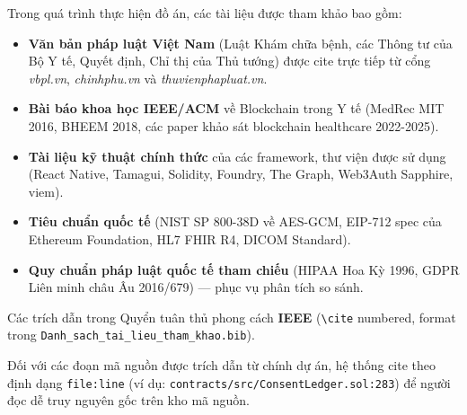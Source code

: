 \documentclass[../DoAn]{subfiles}
\begin{document}

Trong quá trình thực hiện đồ án, các tài liệu được tham khảo bao gồm:

\begin{itemize}
    \item \textbf{Văn bản pháp luật Việt Nam} (Luật Khám chữa bệnh, các Thông tư của Bộ Y tế, Quyết định, Chỉ thị của Thủ tướng) được cite trực tiếp từ cổng \textit{vbpl.vn}, \textit{chinhphu.vn} và \textit{thuvienphapluat.vn}.
    \item \textbf{Bài báo khoa học IEEE/ACM} về Blockchain trong Y tế (MedRec MIT 2016, BHEEM 2018, các paper khảo sát blockchain healthcare 2022-2025).
    \item \textbf{Tài liệu kỹ thuật chính thức} của các framework, thư viện được sử dụng (React Native, Tamagui, Solidity, Foundry, The Graph, Web3Auth Sapphire, viem).
    \item \textbf{Tiêu chuẩn quốc tế} (NIST SP 800-38D về AES-GCM, EIP-712 spec của Ethereum Foundation, HL7 FHIR R4, DICOM Standard).
    \item \textbf{Quy chuẩn pháp luật quốc tế tham chiếu} (HIPAA Hoa Kỳ 1996, GDPR Liên minh châu Âu 2016/679) — phục vụ phân tích so sánh.
\end{itemize}

Các trích dẫn trong Quyển tuân thủ phong cách \textbf{IEEE} (\texttt{\textbackslash{}cite} numbered, format trong \texttt{Danh\_sach\_tai\_lieu\_tham\_khao.bib}).

Đối với các đoạn mã nguồn được trích dẫn từ chính dự án, hệ thống cite theo định dạng \texttt{file:line} (ví dụ: \texttt{contracts/src/ConsentLedger.sol:283}) để người đọc dễ truy nguyên gốc trên kho mã nguồn.
\end{document}
